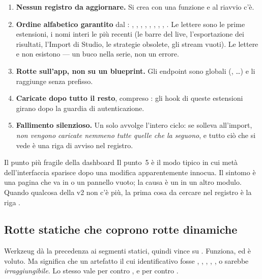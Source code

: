 \begin{enumerate}
  \item \textbf{Nessun registro da aggiornare.} Si crea
         con una funzione
         e al riavvio c'è.
  \item \textbf{Ordine alfabetico garantito} dal : ,
        , , , , ,
        , , . Le lettere sono
        le prime estensioni, i nomi interi le più recenti (le barre del live,
        l'esportazione dei risultati, l'Import di Studio, le strategie
        obsolete, gli stream vuoti). Le lettere  e  non
        esistono --- un buco nella serie, non un errore.
  \item \textbf{Rotte sull'app, non su un blueprint.} Gli endpoint sono
        globali (, \ldots) e
         li raggiunge senza prefisso.
  \item \textbf{Caricate dopo tutto il resto}, compreso
        : gli hook di queste estensioni girano dopo la
        guardia di autenticazione.
  \item \textbf{Fallimento silenzioso.} Un solo  avvolge l'intero
        ciclo: se  solleva all'import, \emph{non vengono
        caricate nemmeno tutte quelle che la seguono}, e tutto ciò che si vede
        è una riga di avviso nel registro.
\end{enumerate}

\begin{attenzione}{Il punto più fragile della dashboard}
Il punto~\num{5} è il modo tipico in cui metà dell'interfaccia sparisce dopo
una modifica apparentemente innocua. Il sintomo è una pagina che va in
 o un pannello vuoto; la causa è un  in un altro
modulo. Quando qualcosa della v2 non c'è più, la prima cosa da cercare nel
registro è la riga .
\end{attenzione}

\subsection{Rotte statiche che coprono rotte dinamiche}

Werkzeug dà la precedenza ai segmenti statici, quindi
 vince su .
Funziona, ed è voluto. Ma significa che un artefatto il cui identificativo
fosse , , , ,
,  o  sarebbe
\emph{irraggiungibile}. Lo stesso vale per  contro
, e per  contro
.

